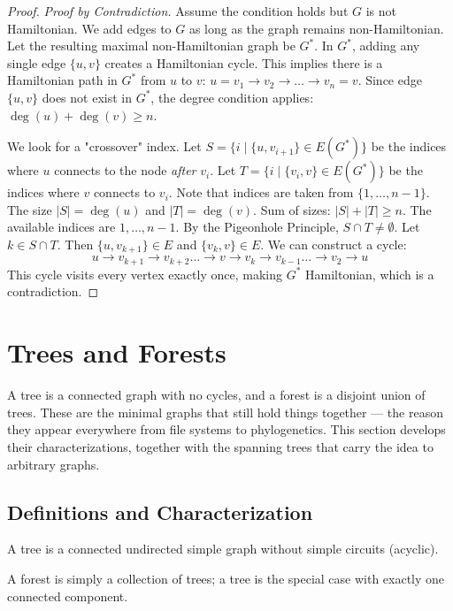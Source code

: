 \begin{proof}
\textit{Proof by Contradiction.}
Assume the condition holds but $G$ is not Hamiltonian. We add edges to $G$ as long as the graph remains non-Hamiltonian. Let the resulting maximal non-Hamiltonian graph be $G^*$.
In $G^*$, adding any single edge $\{u, v\}$ creates a Hamiltonian cycle. This implies there is a Hamiltonian path in $G^*$ from $u$ to $v$: $u = v_1 \to v_2 \to \dots \to v_n = v$.
Since edge $\{u, v\}$ does not exist in $G^*$, the degree condition applies: $\deg(u) + \deg(v) \ge n$.

We look for a "crossover" index. Let $S = \{i \mid \{u, v_{i+1}\} \in E(G^*)\}$ be the indices where $u$ connects to the node \textit{after} $v_i$.
Let $T = \{i \mid \{v_i, v\} \in E(G^*)\}$ be the indices where $v$ connects to $v_i$.
Note that indices are taken from $\{1, \dots, n-1\}$.
The size $|S| = \deg(u)$ and $|T| = \deg(v)$.
Sum of sizes: $|S| + |T| \ge n$.
The available indices are $1, \dots, n-1$. By the Pigeonhole Principle, $S \cap T \neq \emptyset$.
Let $k \in S \cap T$. Then $\{u, v_{k+1}\} \in E$ and $\{v_k, v\} \in E$.
We can construct a cycle:
\[ u \to v_{k+1} \to v_{k+2} \dots \to v \to v_k \to v_{k-1} \dots \to v_2 \to u \]
This cycle visits every vertex exactly once, making $G^*$ Hamiltonian, which is a contradiction.
\end{proof}

\section{Trees and Forests}

A tree is a connected graph with no cycles, and a forest is a disjoint union of trees. These are the minimal graphs that still hold things together — the reason they appear everywhere from file systems to phylogenetics. This section develops their characterizations, together with the spanning trees that carry the idea to arbitrary graphs.

\subsection{Definitions and Characterization}

\begin{definition}[Trees]
A tree is a connected undirected simple graph without simple circuits (acyclic).
\end{definition}

A forest is simply a collection of trees; a tree is the special case with exactly one connected component.

